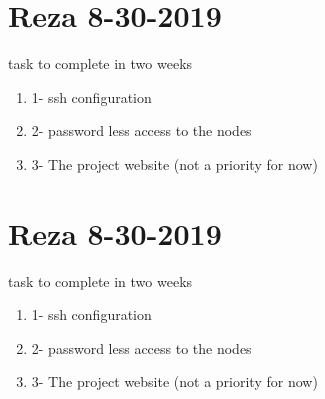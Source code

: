 \section{Reza 8-30-2019}
task to complete in two weeks


\begin{enumerate}
\item 1- ssh configuration 
\item 2- password less access to the nodes 
\item 3- The project website (not a priority for now) 
\end{enumerate}

\section{Reza 8-30-2019}
task to complete in two weeks


\begin{enumerate}
\item 1- ssh configuration 
\item 2- password less access to the nodes 
\item 3- The project website (not a priority for now) 
\end{enumerate}

